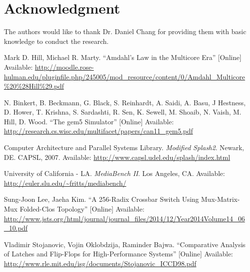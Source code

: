 \documentclass[journal]{IEEEtran}
\begin{document}
\section*{Acknowledgment}
The authors would like to thank Dr. Daniel Chang for providing them with basic knowledge to conduct the research.

\begin{thebibliography}{1}
    Mark D. Hill, Michael R. Marty. ``Amdahl’s Law in the Multicore Era'' [Online]
    Available: \url{http://moodle.rose-hulman.edu/pluginfile.php/245005/mod_resource/content/0/Amdahl_Multicore%20%28Hill%29.pdf}

    N. Binkert, B. Beckmann, G. Black, S. Reinhardt, A. Saidi, A. Basu, J Hestness, D. Hower, T. Krishna, S. Sardashti, R. Sen, K. Sewell, M. Shoaib, N. Vaish, M. Hill, D. Wood. ``The gem5 Simulator'' [Online]
    Available: \url{http://research.cs.wisc.edu/multifacet/papers/can11_gem5.pdf}

    Computer Architecture and Parallel Systems Library. \textit{Modified Splash2}. Newark, DE. CAPSL, 2007.
    Available: \url{http://www.capsl.udel.edu/splash/index.html}

    University of California - LA. \textit{MediaBench II}. Los Angeles, CA.
    Available: \url{http://euler.slu.edu/~fritts/mediabench/}

    Sung-Joon Lee, Jaeha Kim. ``A 256-Radix Crossbar Switch Using Mux-Matrix-Mux Folded-Clos Topology'' [Online]
    Available: \url{http://www.jsts.org/html/journal/journal_files/2014/12/Year2014Volume14_06_10.pdf}

    Vladimir Stojanovic, Vojin Oklobdzija, Raminder Bajwa. ``Comparative Analysis of Latches and Flip-Flops for High-Performance Systems'' [Online]
    Available: \url{http://www.rle.mit.edu/isg/documents/Stojanovic_ICCD98.pdf}
\end{thebibliography}
\end{document}
